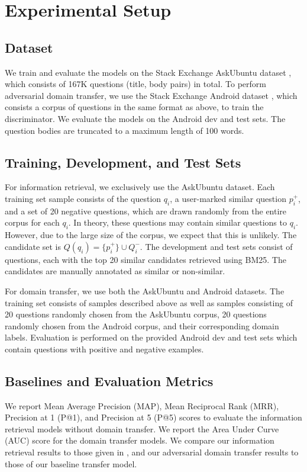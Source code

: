\documentclass[11pt,a4paper]{article}
\begin{document}
\section{Experimental Setup}
\subsection*{Dataset}
We train and evaluate the models on the Stack Exchange AskUbuntu dataset \cite{lei}, which consists of 167K questions (title, body pairs) in total. To perform adversarial domain transfer, we use the Stack Exchange Android dataset \cite{guo}, which consists a corpus of questions in the same format as above, to train the discriminator. We evaluate the models on the Android dev and test sets. The question bodies are truncated to a maximum length of 100 words.

\subsection*{Training, Development, and Test Sets}
For information retrieval, we exclusively use the AskUbuntu dataset. Each training set sample consists of the question $q_i$, a user-marked similar question $p^+_i$, and a set of 20 negative questions, which are drawn randomly from the entire corpus for each $q_i$. In theory, these questions may contain similar questions to $q_i$. However, due to the large size of the corpus, we expect that this is unlikely. The candidate set is $Q(q_i) = \{p^+_i\} \cup Q^-_i$. The development and test sets consist of questions, each with the top 20 similar candidates retrieved using BM25. The candidates are manually annotated as similar or non-similar. 

For domain transfer, we use both the AskUbuntu and Android datasets. The training set consists of samples described above as well as samples consisting of 20 questions randomly chosen from the AskUbuntu corpus, 20 questions randomly chosen from the Android corpus, and their corresponding domain labels. Evaluation is performed on the provided Android dev and test sets which contain questions with positive and negative examples. 



\subsection*{Baselines and Evaluation Metrics}
We report Mean Average Precision (MAP), Mean Reciprocal Rank (MRR), Precision at 1 (P@1), and Precision at 5 (P@5) scores to evaluate the information retrieval models without domain transfer. We report the Area Under Curve (AUC) score for the domain transfer models. We compare our information retrieval results to those given in \cite{lei}, and our adversarial domain transfer results to those of our baseline transfer model. 
\end{document}
